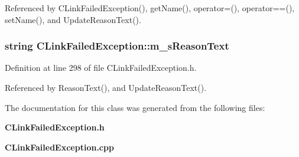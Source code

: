 Referenced by CLink\-Failed\-Exception(), get\-Name(), operator=(), operator==(), set\-Name(), and Update\-Reason\-Text().
\subsubsection{\setlength{\rightskip}{0pt plus 5cm}string CLink\-Failed\-Exception::m\_\-s\-Reason\-Text\hspace{0.3cm}{\tt  [private]}}\label{classCLinkFailedException_o3}




Definition at line 298 of file CLink\-Failed\-Exception.h.

Referenced by Reason\-Text(), and Update\-Reason\-Text().

The documentation for this class was generated from the following files:\begin{CompactItemize}
\item 
{\bf CLink\-Failed\-Exception.h}\item 
{\bf CLink\-Failed\-Exception.cpp}\end{CompactItemize}
